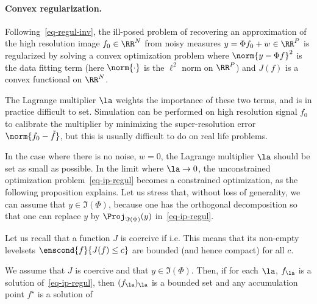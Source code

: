 \paragraph{Convex regularization.}

Following~\eqref{eq-regul-inv}, the ill-posed problem of recovering an approximation of the high resolution image $f_0 \in \RR^N$ from noisy measures $y = \Phi f_0 + w \in \RR^P$ is regularized by solving a convex optimization problem
where $\norm{y-\Phi f}^2$ is the data fitting term (here $\norm{\cdot}$ is the $\ell^2$ norm on $\RR^P$) and $J(f)$ is a convex functional on $\RR^N$.

The Lagrange multiplier $\la$ weights the importance of these two terms, and is in practice difficult to set.
Simulation can be performed on high resolution signal $f_0$ to calibrate the multiplier by minimizing the super-resolution error $\norm{f_0-\tilde f}$, but this is usually difficult to do on real life problems.


In the case where there is no noise, $w = 0$, the Lagrange multiplier $\la$ should be set as small as possible. In the limit where $\la \rightarrow 0$, the unconstrained optimization problem~\eqref{eq-ip-regul} becomes a constrained optimization, as the following proposition explains.
%
Let us stress that, without loss of generality, we can assume that $y \in \Im(\Phi)$, because one has the orthogonal decomposition
so that one can replace $y$ by $\Proj_{\Im(\Phi)}(y)$ in~\eqref{eq-ip-regul}. 

Let us recall that a function $J$ is coercive if
i.e.
This means that its non-empty levelsets $\enscond{f}{J(f) \leq c}$ are bounded (and hence compact) for all $c$.

\begin{prop}\label{prop-gamma-conv-regul}
We assume that $J$ is coercive and that $y \in \Im(\Phi)$. Then, if for each $\la$, $f_\la$ is a solution of~\eqref{eq-ip-regul}, then $(f_\la)_\la$ is a bounded set and any accumulation point $f^\star$ is a solution of
\end{prop}


